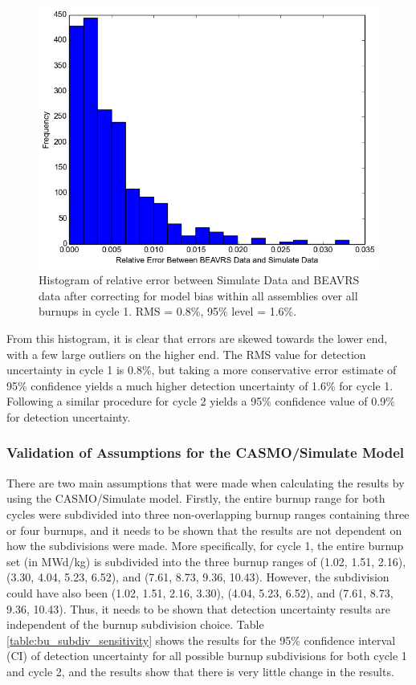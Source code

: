 \documentclass{article}
\begin{document}
\begin{figure}[!htb]
\centering
\includegraphics[keepaspectratio, height = 3.5 in]{figures/sim_cyc1_hist_wo_mb}
\caption{Histogram of relative error between Simulate Data and BEAVRS data after correcting for model bias within all assemblies over all burnups in cycle 1. RMS = 0.8\%, 95\% level = 1.6\%.}
\label{fig:sim_cyc1_hist_wo_mb}
\end{figure}

From this histogram, it is clear that errors are skewed towards the lower end, with a few large outliers on the higher end. The RMS value for detection uncertainty in cycle 1 is 0.8\%, but taking a more conservative error estimate of 95\% confidence yields a much higher detection uncertainty of 1.6\% for cycle 1. Following a similar procedure for cycle 2 yields a 95\% confidence value of 0.9\% for detection uncertainty. 

\subsubsection{Validation of Assumptions for the CASMO/Simulate Model}\label{sec:cassim_assum_valid}

There are two main assumptions that were made when calculating the results by using the CASMO/Simulate model. Firstly, the entire burnup range for both cycles were subdivided into three non-overlapping burnup ranges containing three or four burnups, and it needs to be shown that the results are not dependent on how the subdivisions were made. More specifically, for cycle 1, the entire burnup set (in MWd/kg) is subdivided into the three burnup ranges of (1.02, 1.51, 2.16), (3.30, 4.04, 5.23, 6.52), and (7.61, 8.73, 9.36, 10.43). However, the subdivision could have also been (1.02, 1.51, 2.16, 3.30), (4.04, 5.23, 6.52), and (7.61, 8.73, 9.36, 10.43). Thus, it needs to be shown that detection uncertainty results are independent of the burnup subdivision choice. Table \ref{table:bu_subdiv_sensitivity} shows the results for the 95\% confidence interval (CI) of detection uncertainty for all possible burnup subdivisions for both cycle 1 and cycle 2, and the results show that there is very little change in the results.
\end{document}
